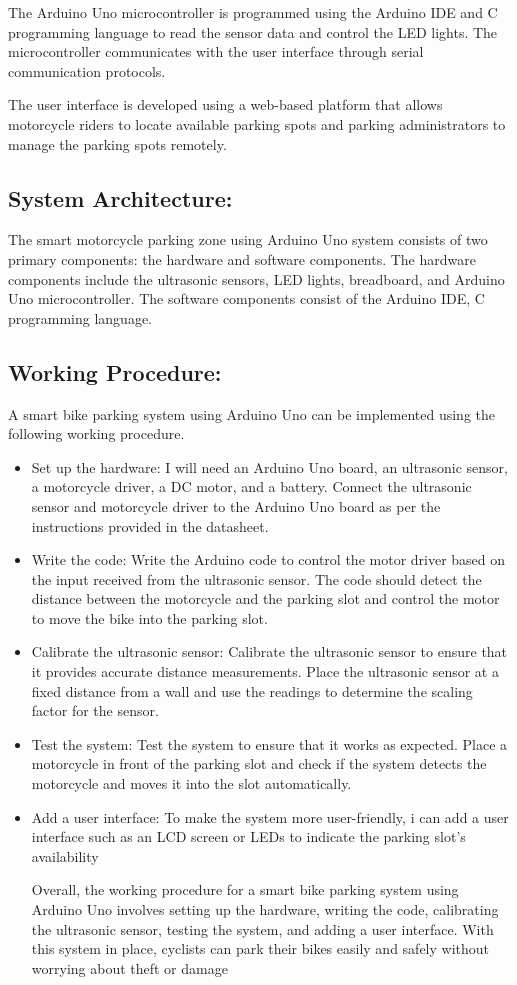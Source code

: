 \documentclass[conference]{IEEEtran}
\begin{document}
The Arduino Uno microcontroller is programmed using the Arduino IDE and C programming language to read the sensor data and control the LED lights. The microcontroller communicates with the user interface through serial communication protocols.

The user interface is developed using a web-based platform that allows motorcycle riders to locate available parking spots and parking administrators to manage the parking spots remotely.
	\subsection{System Architecture:}
	The smart motorcycle parking zone using Arduino Uno system consists of two primary components: the hardware and software components. The hardware components include the ultrasonic sensors, LED lights, breadboard, and Arduino Uno microcontroller. The software components consist of the Arduino IDE, C programming language.
	
	\subsection {Working Procedure:}
		A smart bike parking system using Arduino Uno can be implemented using the following working procedure.
	\begin{itemize}
		\item Set up the hardware: 
		I will need an Arduino Uno board, an ultrasonic sensor, a motorcycle driver, a DC motor, and a battery. Connect the ultrasonic sensor and motorcycle driver to the Arduino Uno board as per the instructions provided in the datasheet.
		\item Write the code:
		Write the Arduino code to control the motor driver based on the input received from the ultrasonic sensor. The code should detect the distance between the motorcycle and the parking slot and control the motor to move the bike into the parking slot.
		\item Calibrate the ultrasonic sensor: 
		Calibrate the ultrasonic sensor to ensure that it provides accurate distance measurements. Place the ultrasonic sensor at a fixed distance from a wall and use the readings to determine the scaling factor for the sensor.
		\item Test the system: 
		Test the system to ensure that it works as expected. Place a motorcycle in front of the parking slot and check if the system detects the motorcycle and moves it into the slot automatically.
		\item  Add a user interface: 
		To make the system more user-friendly, i can add a user interface such as an LCD screen or LEDs to indicate the parking slot's availability
		
		
		
		Overall, the working procedure for a smart bike parking system using Arduino Uno involves setting up the hardware, writing the code, calibrating the ultrasonic sensor, testing the system, and adding a user interface. With this system in place, cyclists can park their bikes easily and safely without worrying about theft or damage
	\end{itemize}	
		
\end{document}
